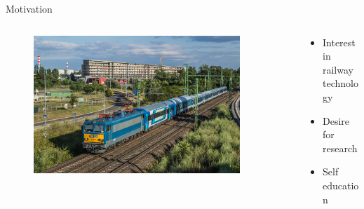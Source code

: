 \documentclass[aspectratio=169]{beamer}
\begin{document}
\begin{frame}{Motivation}
    \pause
    \begin{columns}[T]
        \begin{column}{0.3\textwidth}
            \begin{figure}[H]
                \raggedleft
                \includegraphics[width=0.9\textwidth]{./tex_images/gigant.jpg}
            \end{figure}
        \end{column}
        \pause
        \begin{column}{0.65\textwidth}
            \vspace*{0.5cm}
            \begin{itemize}
                \item Interest in railway technology
                \item Desire for research
                \item Self education
            \end{itemize}
        \end{column}
    \end{columns}
    \pause


\end{frame}
\end{document}

